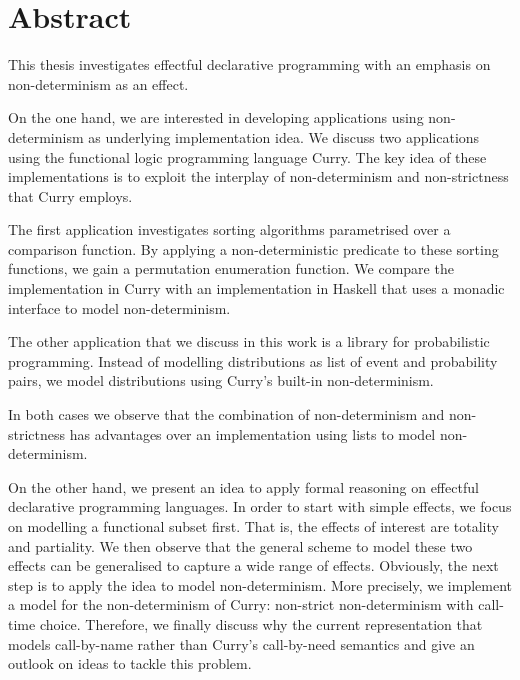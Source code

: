 %
\begingroup
\let\cleardoublepage\clearpage

\chapter*{Abstract}
\label{sec:abstract}
This thesis investigates effectful declarative programming with an emphasis on non\--determinism as an effect.

On the one hand, we are interested in developing applications using non\--determinism as underlying implementation idea.
We discuss two applications using the functional logic programming language Curry.
The key idea of these implementations is to exploit the interplay of non\--determinism and non\--strictness that Curry employs.

The first application investigates sorting algorithms parametrised over a comparison function.
By applying a non\--deterministic predicate to these sorting functions, we gain a permutation enumeration function.
We compare the implementation in Curry with an implementation in Haskell that uses a monadic interface to model non\--determinism.

The other application that we discuss in this work is a library for probabilistic programming.
Instead of modelling distributions as list of event and probability pairs, we model distributions using Curry's built\--in non\--determinism.

In both cases we observe that the combination of non\--determinism and non\--strictness has advantages over an implementation using lists to model non\--determinism.

On the other hand, we present an idea to apply formal reasoning on effectful declarative programming languages.
In order to start with simple effects, we focus on modelling a functional subset first.
That is, the effects of interest are totality and partiality.
We then observe that the general scheme to model these two effects can be generalised to capture a wide range of effects.
Obviously, the next step is to apply the idea to model non\--determinism.
More precisely, we implement a model for the non\--determinism of Curry: non\--strict non\--determinism with call\--time choice.
Therefore, we finally discuss why the current representation that models call\--by\--name rather than Curry's call\--by\--need semantics and give an outlook on ideas to tackle this problem.

